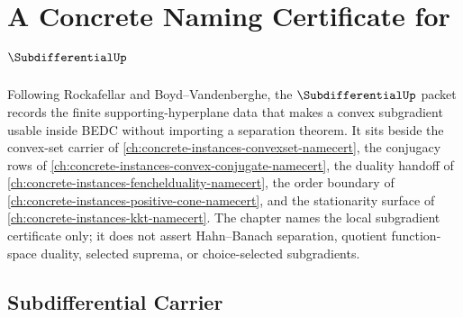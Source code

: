\chapter{A Concrete Naming Certificate for $\SubdifferentialUp$}
\label{ch:concrete-instances-subdifferential-namecert}

Following Rockafellar and Boyd--Vandenberghe, the $\SubdifferentialUp$ packet records the finite supporting-hyperplane data that makes a convex subgradient usable inside BEDC without importing a separation theorem. It sits beside the convex-set carrier of \autoref{ch:concrete-instances-convexset-namecert}, the conjugacy rows of \autoref{ch:concrete-instances-convex-conjugate-namecert}, the duality handoff of \autoref{ch:concrete-instances-fenchelduality-namecert}, the order boundary of \autoref{ch:concrete-instances-positive-cone-namecert}, and the stationarity surface of \autoref{ch:concrete-instances-kkt-namecert}. The chapter names the local subgradient certificate only; it does not assert Hahn--Banach separation, quotient function-space duality, selected suprema, or choice-selected subgradients.

\section{Subdifferential Carrier}
\label{sec:subdifferential-carrier}

